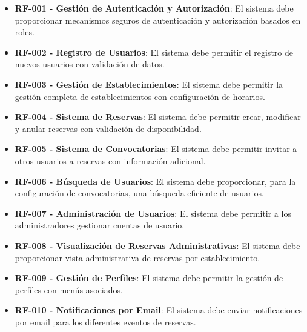 \begin{itemize}
\tightlist
\item
\textbf{RF-001 - Gestión de Autenticación y Autorización}: El sistema debe proporcionar mecanismos seguros de autenticación y autorización basados en roles.
\item
\textbf{RF-002 - Registro de Usuarios}: El sistema debe permitir el registro de nuevos usuarios con validación de datos.
\item
\textbf{RF-003 - Gestión de Establecimientos}: El sistema debe permitir la gestión completa de establecimientos con configuración de horarios.
\item
\textbf{RF-004 - Sistema de Reservas}: El sistema debe permitir crear, modificar y anular reservas con validación de disponibilidad.
\item
\textbf{RF-005 - Sistema de Convocatorias}: El sistema debe permitir invitar a otros usuarios a reservas con información adicional.
\item
\textbf{RF-006 - Búsqueda de Usuarios}: El sistema debe proporcionar, para la configuración de convocatorias, una búsqueda eficiente de usuarios.
\item
\textbf{RF-007 - Administración de Usuarios}: El sistema debe permitir a los administradores gestionar cuentas de usuario.
\item
\textbf{RF-008 - Visualización de Reservas Administrativas}: El sistema debe proporcionar vista administrativa de reservas por establecimiento.
\item
\textbf{RF-009 - Gestión de Perfiles}: El sistema debe permitir la gestión de perfiles con menús asociados.
\item
\textbf{RF-010 - Notificaciones por Email}: El sistema debe enviar notificaciones por email para los diferentes eventos de reservas.
\end{itemize}

